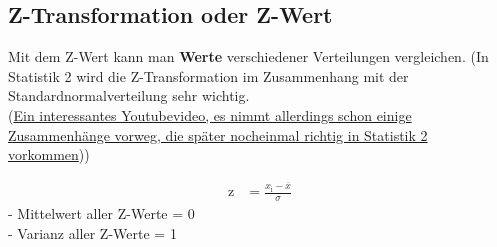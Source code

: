 \subsection{Z-Transformation oder Z-Wert}
  Mit dem Z-Wert kann man \textbf{Werte} verschiedener Verteilungen vergleichen. (In Statistik 2 wird die Z-Transformation im Zusammenhang mit der Standardnormalverteilung sehr wichtig.\\(\href{https://youtu.be/2tuBREK_mgE?t=163}{Ein interessantes Youtubevideo, es nimmt allerdings schon einige Zusammenhänge vorweg, die später nocheinmal richtig in Statistik 2 vorkommen}))


\begin{align*}
 \textrm{z} &= \frac{x_{\textrm{i}} - \overline{x}}{\sigma}
\end{align*}
- Mittelwert aller Z-Werte = 0\\
- Varianz    aller Z-Werte = 1

